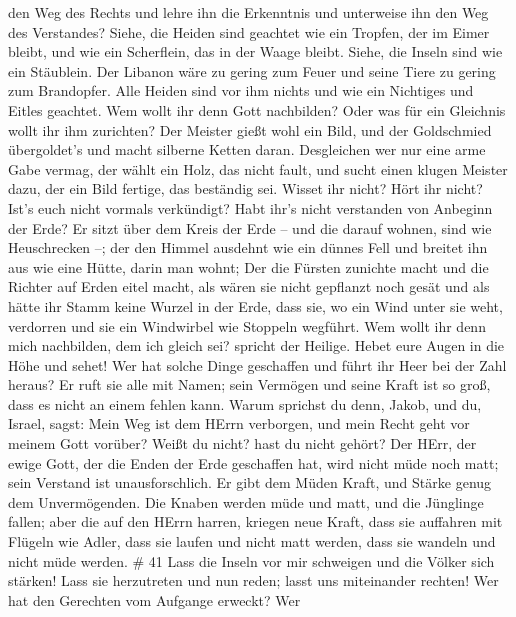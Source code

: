 den Weg des Rechts und lehre ihn die Erkenntnis und unterweise ihn den
Weg des Verstandes?  Siehe, die Heiden sind geachtet wie
ein Tropfen, der im Eimer bleibt, und wie ein Scherflein, das in der
Waage bleibt. Siehe, die Inseln sind wie ein Stäublein. 
Der Libanon wäre zu gering zum Feuer und seine Tiere zu gering zum
Brandopfer.  Alle Heiden sind vor ihm nichts und wie ein
Nichtiges und Eitles geachtet.  Wem wollt ihr denn Gott
nachbilden? Oder was für ein Gleichnis wollt ihr ihm zurichten?
 Der Meister gießt wohl ein Bild, und der Goldschmied
übergoldet's und macht silberne Ketten daran.  Desgleichen
wer nur eine arme Gabe vermag, der wählt ein Holz, das nicht fault, und
sucht einen klugen Meister dazu, der ein Bild fertige, das beständig
sei.  Wisset ihr nicht? Hört ihr nicht? Ist's euch nicht
vormals verkündigt? Habt ihr's nicht verstanden von Anbeginn der Erde?
 Er sitzt über dem Kreis der Erde -- und die darauf wohnen,
sind wie Heuschrecken --; der den Himmel ausdehnt wie ein dünnes Fell
und breitet ihn aus wie eine Hütte, darin man wohnt;  Der
die Fürsten zunichte macht und die Richter auf Erden eitel macht,
 als wären sie nicht gepflanzt noch gesät und als hätte ihr
Stamm keine Wurzel in der Erde, dass sie, wo ein Wind unter sie weht,
verdorren und sie ein Windwirbel wie Stoppeln wegführt. 
Wem wollt ihr denn mich nachbilden, dem ich gleich sei? spricht der
Heilige.  Hebet eure Augen in die Höhe und sehet! Wer hat
solche Dinge geschaffen und führt ihr Heer bei der Zahl heraus? Er ruft
sie alle mit Namen; sein Vermögen und seine Kraft ist so groß, dass es
nicht an einem fehlen kann.  Warum sprichst du denn, Jakob,
und du, Israel, sagst: Mein Weg ist dem HErrn verborgen, und mein Recht
geht vor meinem Gott vorüber?  Weißt du nicht? hast du
nicht gehört? Der HErr, der ewige Gott, der die Enden der Erde
geschaffen hat, wird nicht müde noch matt; sein Verstand ist
unausforschlich.  Er gibt dem Müden Kraft, und Stärke genug
dem Unvermögenden.  Die Knaben werden müde und matt, und
die Jünglinge fallen;  aber die auf den HErrn harren,
kriegen neue Kraft, dass sie auffahren mit Flügeln wie Adler, dass sie
laufen und nicht matt werden, dass sie wandeln und nicht müde werden. \#
41  Lass die Inseln vor mir schweigen und die Völker sich
stärken! Lass sie herzutreten und nun reden; lasst uns miteinander
rechten!  Wer hat den Gerechten vom Aufgange erweckt? Wer
